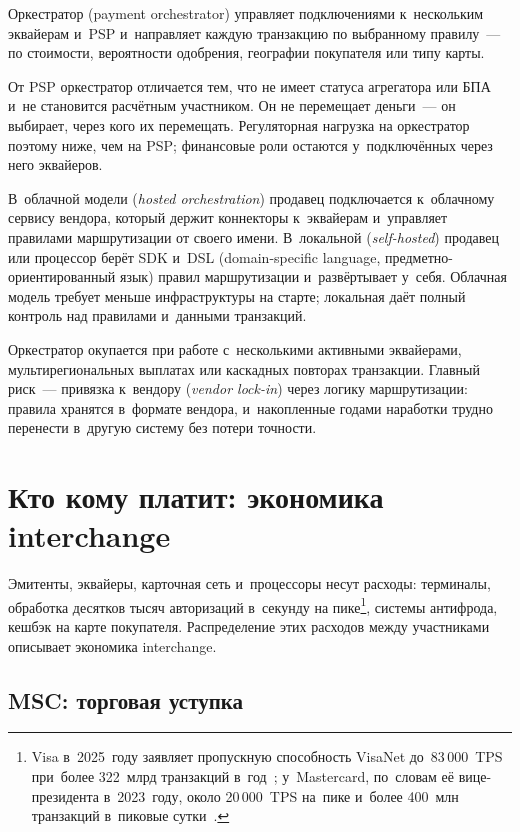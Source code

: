 Оркестратор (payment orchestrator) управляет подключениями к~нескольким
эквайерам и~PSP и~направляет каждую транзакцию по выбранному правилу~--- по
стоимости, вероятности одобрения, географии покупателя или типу карты.

От PSP оркестратор отличается тем, что не имеет статуса агрегатора или БПА
и~не становится расчётным участником. Он не перемещает деньги~--- он
выбирает, через кого их перемещать. Регуляторная нагрузка на оркестратор
поэтому ниже, чем на PSP; финансовые роли остаются у~подключённых через него
эквайеров.

В~облачной модели (\textit{hosted orchestration}) продавец подключается
к~облачному сервису вендора, который держит коннекторы к~эквайерам и~управляет
правилами маршрутизации от своего имени. В~локальной (\textit{self-hosted})
продавец или процессор берёт SDK и~DSL (domain-specific language,
предметно-ориентированный язык) правил маршрутизации и~развёртывает у~себя.
Облачная модель требует меньше инфраструктуры на старте; локальная даёт полный
контроль над правилами и~данными транзакций.

Оркестратор окупается при работе с~несколькими активными эквайерами,
мультирегиональных выплатах или каскадных повторах транзакции. Главный
риск~--- привязка к~вендору (\textit{vendor lock-in}) через логику
маршрутизации: правила хранятся в~формате вендора, и~накопленные годами
наработки трудно перенести в~другую систему без потери точности.

\section{Кто кому платит: экономика interchange}\label{sec:ecosystem-interchange}

Эмитенты, эквайеры, карточная сеть и~процессоры несут расходы: терминалы,
обработка десятков тысяч авторизаций в~секунду на пике\footnote{Visa
  в~2025~году заявляет пропускную способность VisaNet до~83\,000~TPS при~более
  322~млрд транзакций в~год~\cite{visa-engine-2025}; у~Mastercard, по~словам
  её вице-президента в~2023~году, около 20\,000~TPS на~пике и~более 400~млн
транзакций в~пиковые сутки~\cite{futurum-mastercard-2023}.}, системы антифрода, кешбэк на
карте покупателя. Распределение этих расходов между участниками описывает
экономика interchange.

\subsection*{MSC: торговая уступка}

